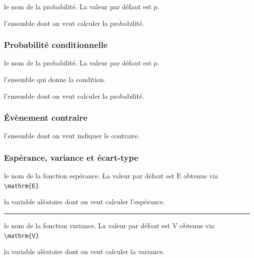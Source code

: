 \documentclass[12pt,a4paper]{article}
\theoremstyle{definition}
\newcommand\separation{
	\medskip
	\hfill\rule{0.5\textwidth}{0.75pt}\hfill
	\medskip
}
\newcommand\extraspace{
	\vspace{0.25em}
}
\begin{document}

\IDoption{} le nom de la probabilité. La valeur par défaut est $p$.

\IDarg{} l'ensemble dont on veut calculer la probabilité.




\subsubsection{Probabilité conditionnelle}





\extraspace




\IDoption{} le nom de la probabilité. La valeur par défaut est $p$.

 l'ensemble qui donne la condition.

 l'ensemble dont on veut calculer la probabilité.


\subsubsection{Évènement contraire}




\IDarg{} l'ensemble dont on veut indiquer le contraire.


\subsubsection{Espérance, variance et écart-type}




\IDoption{} le nom de la fonction espérance. La valeur par défaut est $\mathrm{E}$ obtenue via \verb#\mathrm{E}#.

\IDarg{} la variable aléatoire dont on veut calculer l'espérance.


\separation



\IDoption{} le nom de la fonction variance. La valeur par défaut est $\mathrm{V}$ obtenue via \verb#\mathrm{V}#.

\IDarg{} la variable aléatoire dont on veut calculer la variance.
\end{document}
